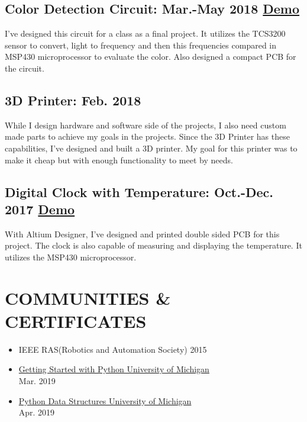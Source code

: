 \documentclass[8pt]{article}
\begin{document}
\subsection{Color Detection Circuit: Mar.-May 2018 \textcolor{Mycolor3}{\href{https://github.com/Zrrck/Color-Detection-using-TCS3200}{}}
\textcolor{Mycolor2}{\href{https://youtu.be/NfwZGEqTPVs}{\small{Demo}}}}
I've designed this circuit for a class as a final project. It utilizes the TCS3200 sensor to convert, light to frequency and then this frequencies compared in MSP430 microprocessor to evaluate the color. Also designed a compact PCB for the circuit.

\subsection{3D Printer: Feb. 2018} 
While I design hardware and software side of the projects, I also need custom made parts to achieve my goals in the projects. Since the 3D Printer has these capabilities, I've designed and built a 3D printer. My goal for this printer was to make it cheap but with enough functionality to meet by needs.

\subsection{Digital Clock with Temperature: Oct.-Dec. 2017 \textcolor{Mycolor3}{\href{https://github.com/Zrrck/Digital-Clock-with-Teperature-Display}{}}
\textcolor{Mycolor2}{\href{https://youtu.be/F9gKzfekm9k}{\small {Demo}}} }
With Altium Designer, I've designed and printed double sided PCB for this project. The clock is also capable of measuring and displaying the temperature. It utilizes the MSP430 microprocessor.




\section{COMMUNITIES \& CERTIFICATES}
\begin{itemize}
\itemsep0em
\item IEEE RAS(Robotics and Automation Society)  2015 


\item \textcolor{Mycolor5}{\href{https://www.coursera.org/account/accomplishments/certificate/8VLTSNMH2832}{Getting Started with Python University of Michigan }}\\
Mar. 2019 

 \item \textcolor{Mycolor5}{\href{https://www.coursera.org/account/accomplishments/certificate/X7QKJD4ASQQD}{Python Data Structures University of Michigan }}\\
 Apr. 2019 
\end{itemize}
\end{document}
